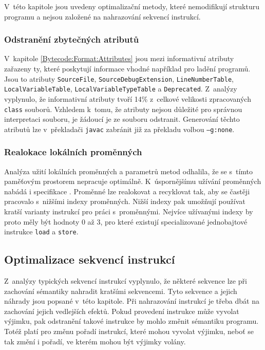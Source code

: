 V~této kapitole jsou uvedeny optimalizační metody, které nemodifikují strukturu programu a nejsou založené na nahrazování sekvencí instrukcí.


\subsubsection{Odstranění zbytečných atributů}
V~kapitole \ref{Bytecode:Format:Attributes} jsou mezi informativní atributy zařazeny ty, které poskytují informace vhodné například pro ladění programů. Jsou to atributy \texttt{SourceFile}, \texttt{SourceDebugExtension}, \texttt{LineNumberTable}, \texttt{LocalVariableTable}, \texttt{LocalVariableTypeTable} a \texttt{Deprecated}.  Z~analýzy vyplynulo, že informativní atributy tvoří 14\% z~celkové velikosti zpracovaných \texttt{class} souborů. Vzhledem k~tomu, že atributy nejsou důležité pro správnou interpretaci souboru, je žádoucí je ze souboru odstranit. Generování těchto atributů lze v~překladači \texttt{javac} zabránit již za překladu volbou \texttt{--g:none}.

\subsubsection{Realokace lokálních proměnných}
Analýza užití lokálních proměnných a parametrů metod odhalila, že se s~tímto paměťovým prostorem nepracuje optimálně. K~úspornějšímu užívání proměnných nabádá i specifikace \cite{Lindholm:JVM}. Proměnné lze realokovat a recyklovat tak, aby se častěji pracovalo s~nižšími indexy proměnných. Nižší indexy pak umožňují používat kratší varianty instrukcí pro práci s~proměnnými. Nejvíce užívanými indexy by proto měly být hodnoty 0 až 3, pro které existují specializované jednobajtové instrukce \texttt{load} a \texttt{store}. 


\subsection{Optimalizace sekvencí instrukcí}

Z~analýzy typických sekvencí instrukcí vyplynulo, že některé sekvence lze při zachování sémantiky nahradit kratšími sekvencemi.
Tyto sekvence a jejich náhrady jsou popsané v~této kapitole.
Při nahrazování instrukcí je třeba dbát na zachování jejich vedlejších efektů. Pokud provedení instrukce může vyvolat výjimku, pak odstranění takové instrukce by mohlo změnit sémantiku programu. Totéž platí pro změnu pořadí instrukcí, které mohou vyvolat výjimku, neboť se tak změní i pořadí, ve kterém mohou být výjimky volány.

